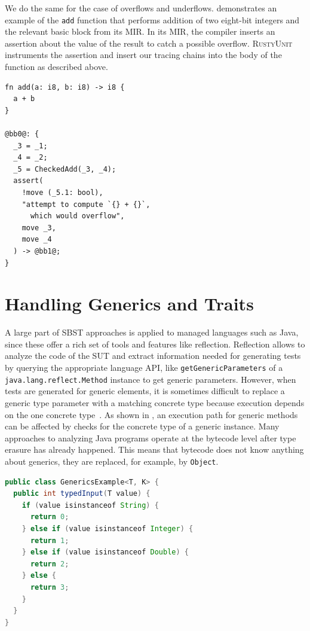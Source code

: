\documentclass[paper=a4,%
  twoside,%
  BCOR4mm,%
  abstract=true,%
  toc=bibliography,%
  chapterprefix=true,%
  toc=bibliographynumbered,%
  open=right,%
  english,%
  pagesize=pdftex]{scrreprt}
\newcommand{\tech}{\textsc{RustyUnit}\xspace}
\newcommand{\mir}{\ac{MIR}\xspace}
\newcommand{\sut}{\ac{SUT}\xspace}
\begin{document}
We do the same for the case of overflows and underflows.  demonstrates an example of the \texttt{add} function that performs addition of two eight-bit integers and the relevant basic block from its \mir. In its \mir, the compiler inserts an assertion about the value of the result to catch a possible overflow. \tech instruments the assertion and insert our tracing chains into the body of the function as described above.
\begin{lstlisting}[language={MIR}, style=boxed, caption={\mir overflow check created by the compiler}, label=lst:mir-overflow-check]
fn add(a: i8, b: i8) -> i8 {
  a + b
}

@bb0@: {
  _3 = _1;
  _4 = _2;
  _5 = CheckedAdd(_3, _4);
  assert(
    !move (_5.1: bool),
    "attempt to compute `{} + {}`,
      which would overflow",
    move _3,
    move _4
  ) -> @bb1@;
}
\end{lstlisting}

\section{Handling Generics and Traits}
A large part of \ac{SBST} approaches is applied to managed languages such as Java, since these offer a rich set of tools and features like reflection. Reflection allows to analyze the code of the \sut and extract information needed for generating tests by querying the appropriate language \ac{API}, like \texttt{getGenericParameters} of a \texttt{java.lang.reflect.Method} instance to get generic parameters. However, when tests are generated for generic elements, it is sometimes difficult to replace a generic type parameter with a matching concrete type because execution depends on the one concrete type~\cite{Fraser2014b}. As shown in , an execution path for generic methods can be affected by checks for the concrete type of a generic instance. Many approaches to analyzing Java programs operate at the bytecode level after type erasure has already happened. This means that bytecode does not know anything about generics, they are replaced, for example, by \texttt{Object}. 

\begin{lstlisting}[language=Java, style=boxed, caption={The execution path of the generic Java method depends on the concrete type of the argument}, label=lst:java-isinstanceof]
public class GenericsExample<T, K> {
  public int typedInput(T value) {
    if (value isinstanceof String) {
      return 0;
    } else if (value isinstanceof Integer) {
      return 1;
    } else if (value isinstanceof Double) {
      return 2;
    } else {
      return 3;
    }
  }
}
\end{lstlisting}
\end{document}
